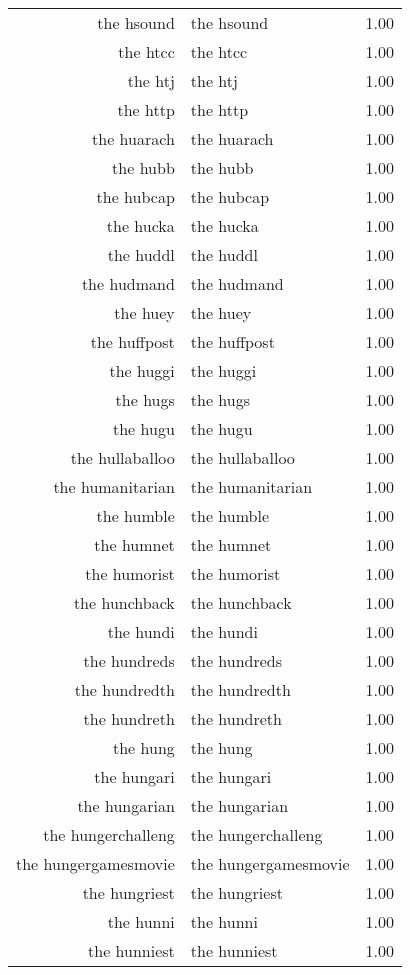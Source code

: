\begin{table}[ht]
\begin{tabular}{rlr}
  the hsound & the hsound & 1.00 \\ 
  the htcc & the htcc & 1.00 \\ 
  the htj & the htj & 1.00 \\ 
  the http & the http & 1.00 \\ 
  the huarach & the huarach & 1.00 \\ 
  the hubb & the hubb & 1.00 \\ 
  the hubcap & the hubcap & 1.00 \\ 
  the hucka & the hucka & 1.00 \\ 
  the huddl & the huddl & 1.00 \\ 
  the hudmand & the hudmand & 1.00 \\ 
  the huey & the huey & 1.00 \\ 
  the huffpost & the huffpost & 1.00 \\ 
  the huggi & the huggi & 1.00 \\ 
  the hugs & the hugs & 1.00 \\ 
  the hugu & the hugu & 1.00 \\ 
  the hullaballoo & the hullaballoo & 1.00 \\ 
  the humanitarian & the humanitarian & 1.00 \\ 
  the humble & the humble & 1.00 \\ 
  the humnet & the humnet & 1.00 \\ 
  the humorist & the humorist & 1.00 \\ 
  the hunchback & the hunchback & 1.00 \\ 
  the hundi & the hundi & 1.00 \\ 
  the hundreds & the hundreds & 1.00 \\ 
  the hundredth & the hundredth & 1.00 \\ 
  the hundreth & the hundreth & 1.00 \\ 
  the hung & the hung & 1.00 \\ 
  the hungari & the hungari & 1.00 \\ 
  the hungarian & the hungarian & 1.00 \\ 
  the hungerchalleng & the hungerchalleng & 1.00 \\ 
  the hungergamesmovie & the hungergamesmovie & 1.00 \\ 
  the hungriest & the hungriest & 1.00 \\ 
  the hunni & the hunni & 1.00 \\ 
  the hunniest & the hunniest & 1.00 \\ 

\end{tabular}
\end{table}
